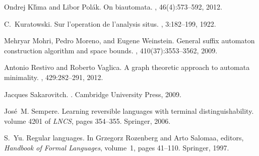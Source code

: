 \documentclass{article}
\begin{document}
\begin{thebibliography}{BBMR14}
Ondrej Kl{\'{\i}}ma and Libor Pol{\'{a}}k.
\newblock On biautomata.
, 46(4):573--592, 2012.

C.~Kuratowski.
\newblock Sur l’operation  de l’analysis situs.
, 3:182--199, 1922.

Mehryar Mohri, Pedro Moreno, and Eugene Weinstein.
\newblock General suffix automaton construction algorithm and space bounds.
, 410(37):3553--3562, 2009.

Antonio Restivo and Roberto Vaglica.
\newblock A graph theoretic approach to automata minimality.
, 429:282--291, 2012.

Jacques Sakarovitch.
.
\newblock Cambridge University Press, 2009.

Jos{\'e}~M. Sempere.
\newblock Learning reversible languages with terminal distinguishability.
\newblock volume 4201 of {\em LNCS}, pages 354--355. Springer, 2006.

S.~Yu.
\newblock Regular languages.
\newblock In Grzegorz Rozenberg and Arto Salomaa, editors, {\em Handbook of
  {F}ormal {L}anguages}, volume~1, pages 41--110. Springer, 1997.

\end{thebibliography}
\end{document}
